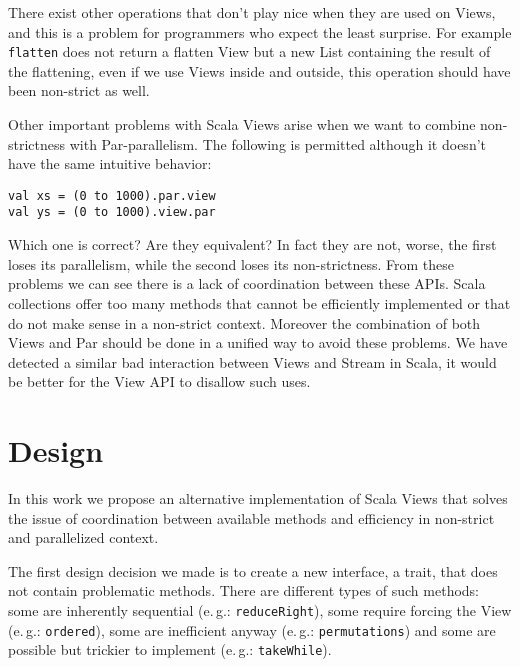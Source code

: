 \documentclass[a4paper,12pt,twocolumn]{article}
\newcommand{\eg}{e.\,g.}
\begin{document}
There exist other operations that don't play nice when they are used on Views, and this is a problem for programmers who expect the least surprise.
For example \verb|flatten| does not return a flatten View but a new List containing the result of the flattening, even if we use Views inside and outside, this operation should have been non-strict as well.

Other important problems with Scala Views arise when we want to combine non-strictness with Par-parallelism.
The following is permitted although it doesn't have the same intuitive behavior:

\begin{lstlisting}
val xs = (0 to 1000).par.view
val ys = (0 to 1000).view.par
\end{lstlisting}

Which one is correct? Are they equivalent? In fact they are not, worse, the first loses its parallelism, while the second loses its non-strictness.
From these problems we can see there is a lack of coordination between these APIs.
Scala collections offer too many methods that cannot be efficiently implemented or that do not make sense in a non-strict context.
Moreover the combination of both Views and Par should be done in a unified way to avoid these problems.
We have detected a similar bad interaction between Views and Stream in Scala, it would be better for the View API to disallow such uses.


\section{Design}
In this work we propose an alternative implementation of Scala Views that solves the issue of coordination between available methods and efficiency in non-strict and parallelized context.

The first design decision we made is to create a new interface, a trait, that does not contain problematic methods.
There are different types of such methods: some are inherently sequential (\eg: \verb|reduceRight|), some require forcing the View (\eg: \verb|ordered|), some are inefficient anyway (\eg: \verb|permutations|) and some are possible but trickier to implement (\eg: \verb|takeWhile|).
\end{document}
